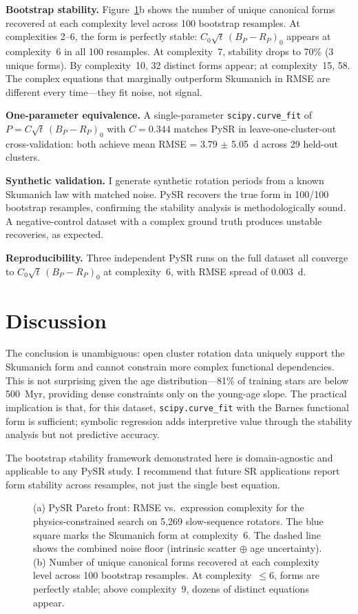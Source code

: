 \documentclass[RNAAS]{aastex7}
\begin{document}
\textbf{Bootstrap stability.}
Figure~\ref{fig:main}b shows the number of unique canonical forms recovered at each complexity level across 100 bootstrap resamples.
At complexities 2--6, the form is perfectly stable: $C_0 \sqrt{t}\,(B_P - R_P)_0$ appears at complexity~6 in all 100 resamples.
At complexity~7, stability drops to 70\% (3 unique forms).
By complexity~10, 32 distinct forms appear; at complexity~15, 58.
The complex equations that marginally outperform Skumanich in RMSE are different every time---they fit noise, not signal.

\textbf{One-parameter equivalence.}
A single-parameter \texttt{scipy.curve\_fit} of $P = C\sqrt{t}\,(B_P - R_P)_0$ with $C = 0.344$ matches PySR in leave-one-cluster-out cross-validation: both achieve mean RMSE = 3.79 $\pm$ 5.05~d across 29 held-out clusters.

\textbf{Synthetic validation.}
I generate synthetic rotation periods from a known Skumanich law with matched noise.
PySR recovers the true form in 100/100 bootstrap resamples, confirming the stability analysis is methodologically sound.
A negative-control dataset with a complex ground truth produces unstable recoveries, as expected.

\textbf{Reproducibility.}
Three independent PySR runs on the full dataset all converge to $C_0 \sqrt{t}\,(B_P - R_P)_0$ at complexity~6, with RMSE spread of 0.003~d.

\section{Discussion}

The conclusion is unambiguous: open cluster rotation data uniquely support the Skumanich form and cannot constrain more complex functional dependencies.
This is not surprising given the age distribution---81\% of training stars are below 500~Myr, providing dense constraints only on the young-age slope.
The practical implication is that, for this dataset, \texttt{scipy.curve\_fit} with the Barnes functional form is sufficient; symbolic regression adds interpretive value through the stability analysis but not predictive accuracy.

The bootstrap stability framework demonstrated here is domain-agnostic and applicable to any PySR study.
I recommend that future SR applications report form stability across resamples, not just the single best equation.

\begin{figure}[t]
\caption{(a) PySR Pareto front: RMSE vs.\ expression complexity for the physics-constrained search on 5,269 slow-sequence rotators. The blue square marks the Skumanich form at complexity~6. The dashed line shows the combined noise floor (intrinsic scatter $\oplus$ age uncertainty). (b) Number of unique canonical forms recovered at each complexity level across 100 bootstrap resamples. At complexity~$\leq 6$, forms are perfectly stable; above complexity~9, dozens of distinct equations appear. \label{fig:main}}
\end{figure}
\end{document}
